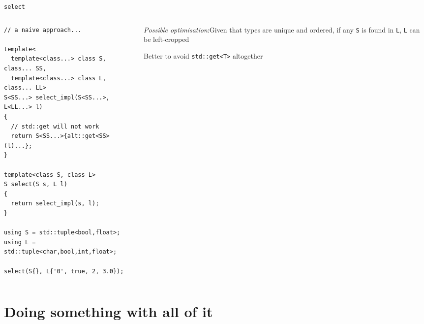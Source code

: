 \documentclass[xcolor=dvipsnames]{beamer}
\begin{document}
\begin{frame}[fragile]{\texttt{select}}
  \begin{columns}[T]
    \begin{column}{0.62\textwidth}
      \begin{lstlisting}[basicstyle=\scriptsize\ttfamily]
// a naive approach...

template<
  template<class...> class S, class... SS,
  template<class...> class L, class... LL>
S<SS...> select_impl(S<SS...>, L<LL...> l)
{
  // std::get will not work
  return S<SS...>{alt::get<SS>(l)...};
}

template<class S, class L>
S select(S s, L l)
{
  return select_impl(s, l);
}

using S = std::tuple<bool,float>;
using L = std::tuple<char,bool,int,float>;

select(S{}, L{'0', true, 2, 3.0});
      \end{lstlisting}
    \end{column}
    \hfill
    \begin{column}{0.4\textwidth}
      \vspace{5mm}
      \emph{Possible optimisation}:\newline Given that types are unique and ordered, if any \texttt{S} is found in \texttt{L}, \texttt{L} can be left-cropped\newline

      Better to avoid \texttt{std::get<T>} altogether
    \end{column}
  \end{columns}
\end{frame}



\section{Doing something with all of it}
\end{document}
